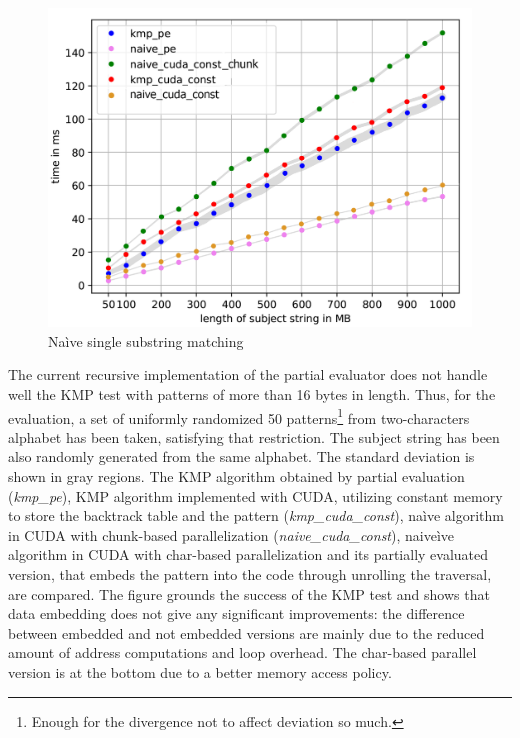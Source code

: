\begin{figure}
    \centering
    \includegraphics[width=0.85\linewidth]{figures/KMP_TEST.png}
    \caption{Na\`ive single substring matching}
    \label{fig:kmp_test}
\end{figure}

The current recursive implementation of the partial evaluator does not 
handle well the KMP test with patterns of more than 16 bytes in length. 
Thus, for the evaluation, a set of uniformly randomized 50 patterns\footnote{Enough for the divergence not to affect deviation so much.} 
from two-characters alphabet has been taken, satisfying that restriction. The subject string has been also randomly generated from the same alphabet. The standard deviation is shown in gray regions.
The KMP algorithm obtained by partial evaluation (\emph{kmp\_pe}), KMP algorithm implemented with CUDA, utilizing constant memory to store the backtrack table and the pattern (\emph{kmp\_cuda\_const}), 
na\`ive algorithm in CUDA with chunk-based parallelization (\emph{naive\_cuda\_const}), naive\`ive algorithm in CUDA with char-based parallelization and its partially evaluated version, that embeds the 
pattern into the code through unrolling the traversal, are compared. The figure grounds the success of the KMP test and shows that data embedding does not give any significant improvements: the difference 
between embedded and not embedded versions are mainly due to the reduced amount of address computations and loop overhead. The char-based parallel version is at the bottom due to a better memory access policy.

